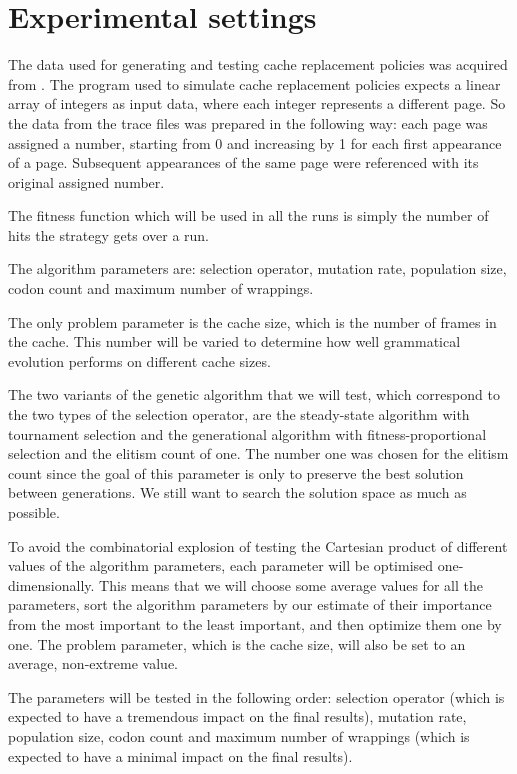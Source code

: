 \section{Experimental settings}
The data used for generating and testing cache replacement policies was acquired from \citep{data}. The program used to simulate cache replacement policies expects a linear array of integers as input data, where each integer represents a different page. So the data from the trace files was prepared in the following way: each page was assigned a number, starting from 0 and increasing by 1 for each first appearance of a page. Subsequent appearances of the same page were referenced with its original assigned number. 

The fitness function which will be used in all the runs is simply the number of hits the strategy gets over a run.

The algorithm parameters are: selection operator, mutation rate, population size, codon count and maximum number of wrappings.

The only problem parameter is the cache size, which is the number of frames in the cache. This number will be varied to determine how well grammatical evolution performs on different cache sizes.

The two variants of the genetic algorithm that we will test, which correspond to the two types of the selection operator, are the steady-state algorithm with tournament selection and the generational algorithm with fitness-proportional selection and the elitism count of one. The number one was chosen for the elitism count since the goal of this parameter is only to preserve the best solution between generations. We still want to search the solution space as much as possible.

To avoid the combinatorial explosion of testing the Cartesian product of different values of the algorithm parameters, each parameter will be optimised one-dimensionally. This means that we will choose some average values for all the parameters, sort the algorithm parameters by our estimate of their importance from the most important to the least important, and then optimize them one by one. The problem parameter, which is the cache size, will also be set to an average, non-extreme value.

The parameters will be tested in the following order: selection operator (which is expected to have a tremendous impact on the final results), mutation rate, population size, codon count and maximum number of wrappings (which is expected to have a minimal impact on the final results).

